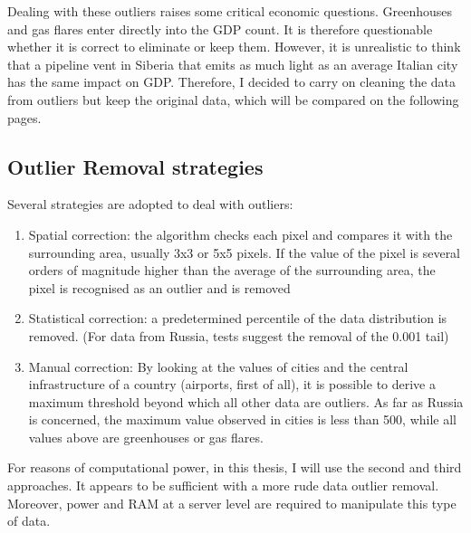 Dealing with these outliers raises some critical economic questions. Greenhouses and gas flares enter directly into the GDP count. It is therefore questionable whether it is correct to eliminate or keep them. However, it is unrealistic to think that a pipeline vent in Siberia that emits as much light as an average Italian city has the same impact on GDP. Therefore, I decided to carry on cleaning the data from outliers but keep the original data, which will be compared on the following pages. 

\subsection{Outlier Removal strategies}

Several strategies are adopted to deal with outliers:
\begin{enumerate}
    \item Spatial correction: the algorithm checks each pixel and compares it with the surrounding area, usually 3x3 or 5x5 pixels. If the value of the pixel is several orders of magnitude higher than the average of the surrounding area, the pixel is recognised as an outlier and is removed
    \item Statistical correction: a predetermined percentile of the data distribution is removed. (For data from Russia, tests suggest the removal of the 0.001 tail)
    \item Manual correction: By looking at the values of cities and the central infrastructure of a country (airports, first of all), it is possible to derive a maximum threshold beyond which all other data are outliers. As far as Russia is concerned, the maximum value observed in cities is less than 500, while all values above are greenhouses or gas flares.
\end{enumerate}

For reasons of computational power, in this thesis, I will use the second and third approaches. It appears to be sufficient with a more rude data outlier removal. Moreover, power and RAM at a server level are required to manipulate this type of data.
